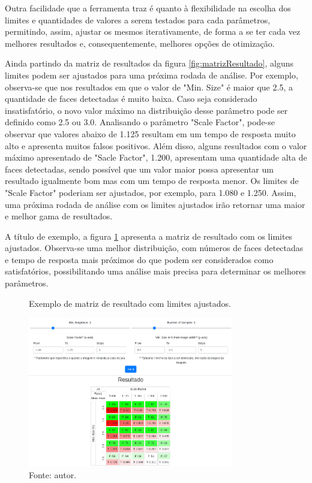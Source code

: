 Outra facilidade que a ferramenta traz é quanto à flexibilidade na escolha dos limites e quantidades de valores a serem testados para cada parâmetros, permitindo, assim, ajustar os mesmos iterativamente, de forma a se ter cada vez melhores resultados e, consequentemente, melhores opções de otimização.

Ainda partindo da matriz de resultados da figura \ref{fig:matrizResultado}, alguns limites podem ser ajustados para uma próxima rodada de análise. Por exemplo, observa-se que nos resultados em que o valor de "Min. Size" é maior que 2.5, a quantidade de faces detectadas é muito baixa. Caso seja considerado insatisfatório, o novo valor máximo na distribuição desse parâmetro pode ser definido como 2.5 ou 3.0. Analisando o parâmetro "Scale Factor", pode-se observar que valores abaixo de 1.125 resultam em um tempo de resposta muito alto e apresenta muitos falsos positivos. Além disso, alguns resultados com o valor máximo apresentado de "Sacle Factor", 1.200, apresentam uma quantidade alta de faces detectadas, sendo possível que um valor maior possa apresentar um resultado igualmente bom mas com um tempo de resposta menor. Os limites de "Scale Factor" poderiam ser ajustados, por exemplo, para 1.080 e 1.250. Assim, uma próxima rodada de análise com os limites ajustados irão retornar uma maior e melhor gama de resultados.

A título de exemplo, a figura \ref{fig:matrizResultado2} apresenta a matriz de resultado com os limites ajustados. Observa-se uma melhor distribuição, com números de faces detectadas e tempo de resposta mais próximos do que podem ser considerados como satisfatórios, possibilitando uma análise mais precisa para determinar os melhores parâmetros.

\begin{figure}[h]
    \centering
    \caption[Exemplo de matriz de resultado com limites ajustados.]{Exemplo de matriz de resultado com limites ajustados.}
    \includegraphics[width=0.8\textwidth]{Cap3_Desenvolvimento/Figures/exemplo_resultado_matriz_2.jpg}
    \caption*{Fonte: autor.}
    \label{fig:matrizResultado2}
\end{figure}

